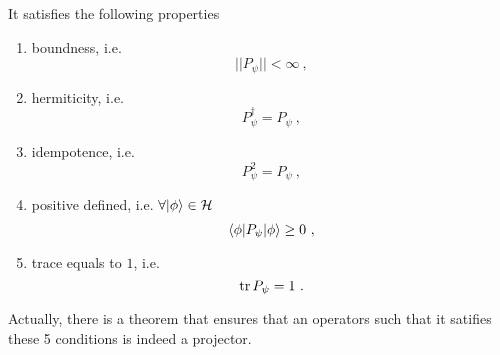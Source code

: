     It satisfies the following properties 
    \begin{enumerate}
        \item boundness, i.e. 
            \begin{equation*}
                ||P_\psi|| < \infty~,
            \end{equation*}
        \item hermiticity, i.e. 
            \begin{equation*}
                P_\psi^\dagger = P_\psi ~,
            \end{equation*}
        \item idempotence, i.e. 
            \begin{equation}\label{idem}
                P_\psi^2 = P_\psi ~,
            \end{equation}
        \item positive defined, i.e. $\forall \vert\phi\rangle \in \mathcal H$
            \begin{equation*}
                \langle\phi\vert P_\psi \vert\phi\rangle \geq 0 ~,
            \end{equation*}
        \item trace equals to $1$, i.e. 
            \begin{equation*}
                \operatorname{tr} P_\psi = 1 ~.
            \end{equation*}
    \end{enumerate}
    Actually, there is a theorem that ensures that an operators such that it satifies these 5 conditions is indeed a projector.
